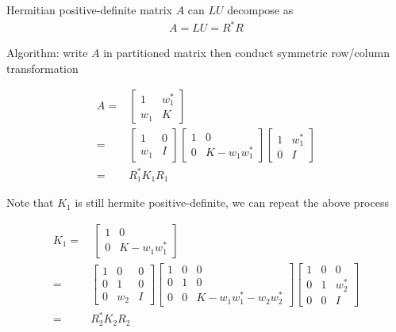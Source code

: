     Hermitian positive-definite matrix $ A $ can $ LU $ decompose as
    \begin{align}
        A=LU=R^*R
    \end{align}
    
    Algorithm: write $ A $ in partitioned matrix then conduct symmetric row/column transformation
    
\begin{align}
    A=&\begin{bmatrix}
      1&w_1^*\\
      w_1&K
    \end{bmatrix}
    \\
    =&\begin{bmatrix}
    1&0\\w_1&I
    \end{bmatrix}
    \begin{bmatrix}
    1&0\\0&K-w_1w_1^*
    \end{bmatrix}
    \begin{bmatrix}
    1&w_1^*\\0&I
    \end{bmatrix}\\
    =&R_1^*K_1R_1
  \end{align} 
    

    Note that $ K_1 $ is still hermite positive-definite, we can repeat the above process
    
        \begin{align}
            K_1=&\
            \begin{bmatrix}
            1&0\\0&K-w_1w_1^*
            \end{bmatrix}\\
            =&\begin{bmatrix}
            1&0&0\\
            0&1&0\\
            0&w_2&I
            \end{bmatrix}
            \begin{bmatrix}
            1&0&0\\
            0&1&0\\
            0&0&K-w_1w_1^*-w_2w_2^*
            \end{bmatrix}
            \begin{bmatrix}
            1&0&0\\
            0&1&w_2^*\\
            0&0&I
            \end{bmatrix}\\
            =&R_2^*K_2R_2
          \end{align} 
    


